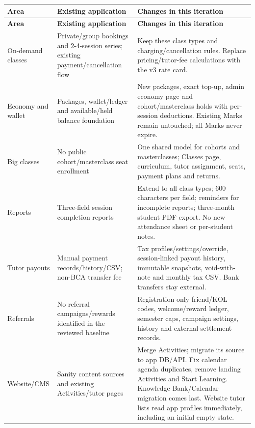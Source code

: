 \documentclass[11pt,a4paper]{article}
\begin{document}
{\small
\begin{longtable}{|L{28.54mm}|L{52.57mm}|L{69.09mm}|}
\hline
\textbf{Area} & \textbf{Existing application} & \textbf{Changes in this iteration} \\ \hline
\endfirsthead
\hline
\textbf{Area} & \textbf{Existing application} & \textbf{Changes in this iteration} \\ \hline
\endhead
On-demand classes & Private/\allowbreak{}group bookings and 2-4-session series; existing payment/\allowbreak{}cancellation flow & Keep these class types and charging/\allowbreak{}cancellation rules. Replace pricing/\allowbreak{}tutor-fee calculations with the v3 rate card. \\ \hline
Economy and wallet & Packages, wallet/\allowbreak{}ledger and available/\allowbreak{}held balance foundation & New packages, exact top-up, admin economy page and cohort/\allowbreak{}masterclass holds with per-session deductions. Existing Marks remain untouched; all Marks never expire. \\ \hline
Big classes & No public cohort/\allowbreak{}masterclass seat enrollment & One shared model for cohorts and masterclasses; Classes page, curriculum, tutor assignment, seats, payment plans and returns. \\ \hline
Reports & Three-field session completion reports & Extend to all class types; 600 characters per field; reminders for incomplete reports; three-month student PDF export. No new attendance sheet or per-student notes. \\ \hline
Tutor payouts & Manual payment records/\allowbreak{}history/\allowbreak{}CSV; non-BCA transfer fee & Tax profiles/\allowbreak{}settings/\allowbreak{}override, session-linked payout history, immutable snapshots, void-with-note and monthly tax CSV. Bank transfers stay external. \\ \hline
Referrals & No referral campaigns/\allowbreak{}rewards identified in the reviewed baseline & Registration-only friend/\allowbreak{}KOL codes, welcome/\allowbreak{}reward ledger, semester caps, campaign settings, history and external settlement records. \\ \hline
Website/\allowbreak{}CMS & Sanity content sources and existing Activities/\allowbreak{}tutor pages & Merge Activities; migrate its source to app DB/\allowbreak{}API. Fix calendar agenda duplicates, remove landing Activities and Start Learning. Knowledge Bank/\allowbreak{}Calendar migration comes last. Website tutor lists read app profiles immediately, including an initial empty state. \\ \hline
\end{longtable}
}
\end{document}
